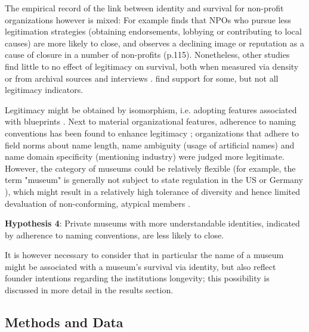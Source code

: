 \documentclass[12pt]{article}
\begin{document}
The empirical record of the link between identity and survival for non-profit organizations however is mixed: 
For example \textcite{Bielefeld_1994_survival} finds that NPOs who pursue less legitimation strategies (obtaining endorsements, lobbying or contributing to local causes) are more likely to close, and \textcite{HernandezOrtiz_2022_discontinuity} observes a declining image or reputation as a cause of closure in a number of non-profits (p.115).
Nonetheless, other studies find little to no effect of legitimacy on survival, both when measured via density \parencite{Bogaert_etal_2014_ecological} or from archival sources and interviews \parencite{Fernandez_2007_dissolution}.
\textcite{Walker_McCarthy_2010_survival} find support for some, but not all legitimacy indicators. 


Legitimacy might be obtained by isomorphism, i.e. adopting features associated with blueprints \parencite{diMaggio_1983_iron}.
Next to material organizational features, adherence to naming conventions has been found to enhance legitimacy \parencite{Glynn_Abzug_2002_names}; organizations that adhere to field norms about name length, name ambiguity (usage of artificial names) and name domain specificity (mentioning industry) were judged more legitimate. 
However, the category of museums could be relatively flexible (for example, the term "museum" is generally not subject to state regulation in the US or Germany \parencite{Museumsbund_ICOMDE_2006_standards,Lister_2023_marketing}), which might result in a relatively high tolerance of diversity and hence limited devaluation of non-conforming, atypical members \parencite{Bogaert_etal_2014_ecological}.


\bigbreak
\noindent
\textbf{Hypothesis 4}: Private museums with more understandable identities, indicated by adherence to naming conventions, are less likely to close. 


It is however necessary to consider that in particular the name of a museum might be associated with a museum's survival via identity, but also reflect founder intentions regarding the institutions longevity; this possibility is discussed in more detail in the results section.
\subsection*{Methods and Data}
\end{document}
